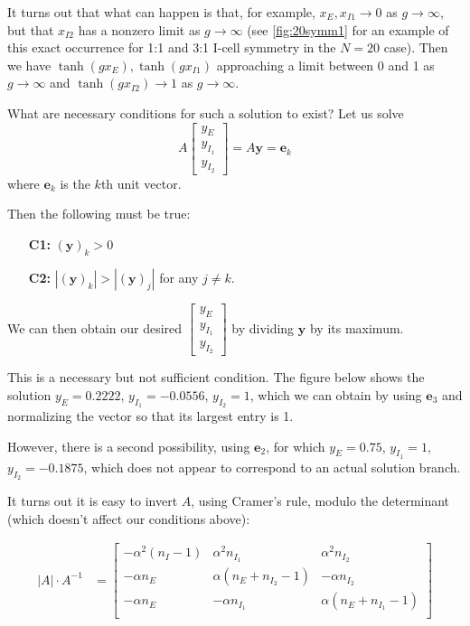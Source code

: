 \documentclass[11pt,reqno]{amsart}
\begin{document}
It turns out that what can happen is that, for example, $x_{E}, x_{I1} \rightarrow 0$ as $g \rightarrow \infty$, but that $x_{I2}$ has a nonzero limit as $g \rightarrow \infty$ (see \cref{fig:20symm1} for an example of this exact occurrence for 1:1 and 3:1 I-cell symmetry in the $N=20$ case). Then we have $\tanh(g x_E), \tanh(g x_{I1})$ approaching a limit between 0 and 1 as $g \rightarrow \infty$ and $\tanh(g x_{I2}) \rightarrow 1$ as $g \rightarrow \infty$.

What are necessary conditions for such a solution to exist? Let us solve
\[ A \begin{bmatrix} y_E\\y_{I_1}\\y_{I_2}\end{bmatrix} = A \textbf{y} = \textbf{e}_k 
\]
where $\textbf{e}_k$ is the $k$th unit vector.

Then the following must be true:
\begin{enumerate}
    \item[\textbf{C1:}] $(\textbf{y})_k > 0$
    \item[\textbf{C2:}] $|(\textbf{y})_k| > |(\textbf{y})_j|$ for any $j\not=k$. 
\end{enumerate}
We can then obtain our desired $\begin{bmatrix} y_E\\y_{I_1}\\y_{I_2}\end{bmatrix} $ by dividing $\textbf{y}$ by its maximum.

This is a necessary but not sufficient condition. The figure below shows the solution $y_E = 0.2222$, $y_{I_1}=-0.0556$, $y_{I_2}=1$, which we can obtain by using $\textbf{e}_3$ and normalizing the vector so that its largest entry is 1.

However, there is a second possibility, using $\textbf{e}_2$, for which $y_E = 0.75$, $y_{I_1}=1$, $y_{I_2}=-0.1875$, which does not appear to correspond to an actual solution branch.

It turns out it is easy to invert $A$, using Cramer's rule, modulo the determinant (which doesn't affect our conditions above):

\begin{align*}
    \vert A \vert \cdot A^{-1} & = \begin{bmatrix}
    -\alpha^2 (n_I-1) & \alpha^2 n_{I_1} & \alpha^2 n_{I_2}\\
    -\alpha n_E & \alpha (n_E + n_{I_2}-1) & -\alpha n_{I_2}\\
    -\alpha n_E & -\alpha n_{I_1} & \alpha (n_E + n_{I_1}-1)\\
    \end{bmatrix}
\end{align*}
\end{document}
